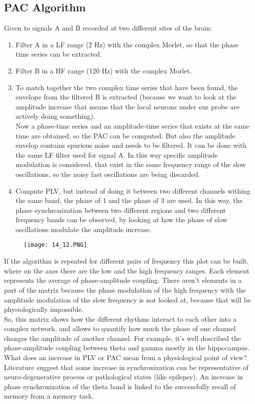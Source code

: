 \subsection{PAC Algorithm}
Given to signals A and B recorded at two different sites of the brain:
\begin{enumerate}
    \item Filter A in a LF range (2 Hz) with the complex Morlet, so that the phase time series can be extracted.
    \item Filter B in a HF range (120 Hz) with the complex Morlet.
    \item To match together the two complex time series that have been found, the envelope from the filtered B is extracted (because we want to look at the amplitude increase that means that the local neurons under our probe are actively doing something).\\
    Now a phase-time series and an amplitude-time series that exists at the same time are obtained, so the PAC can be computed. But also the amplitude envelop contains spurious noise and needs to be filtered. It can be done with the same LF filter used for signal A.
    In this way specific amplitude modulation is considered, that exist in the same frequency range of the slow oscillations, so the noisy fast oscillations are being discarded.
    \item Compute PLV, but instead of doing it between two different channels withing the same band, the phase of 1 and the phase of 3 are used. In this way, the phase synchronization between two different regions and two different frequency bands can be observed, by looking at how the phase of slow oscillations modulate the amplitude increase.
\end{enumerate}
\begin{figure}[H]
    \centering
    \texttt{[image: 14\_12.PNG]}
\end{figure}
If the algorithm is repeated for different pairs of frequency this plot can be built, where on the axes there are the low and the high frequency ranges. Each element represents the average of phase-amplitude coupling. There aren't elements in a part of the matrix because the phase modulation of the high frequency with the amplitude modulation of the slow frequency is not looked at, because that will be physiologically impossible.\\
So, this matrix shows how the different rhythms interact to each other into a complex network, and  allows to quantify how much the phase of one channel changes the amplitude of another channel. For example, it's well described the phase-amplitude coupling between theta and gamma mostly in the hippocampus.\\
What does an increase in PLV or PAC mean from a physiological point of view? Literature suggest that some increase in synchronization can be representative of neuro-degenerative process or pathological states (like epilepsy). An increase in phase synchronization of the theta band is linked to the successfully recall of memory from a memory task.
